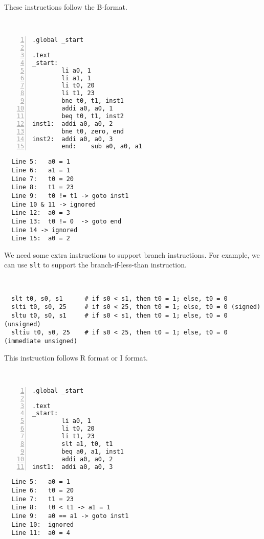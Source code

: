 These instructions follow the B-format.

\begin{eg}~

\begin{minipage}{0.5\textwidth}
\begin{Verbatim}[numbers=left,xleftmargin=5mm]
.global _start

.text
_start:
        li a0, 1
        li a1, 1
        li t0, 20
        li t1, 23
        bne t0, t1, inst1
        addi a0, a0, 1
        beq t0, t1, inst2
inst1:  addi a0, a0, 2
        bne t0, zero, end
inst2:  addi a0, a0, 3
        end:    sub a0, a0, a1
\end{Verbatim}
\end{minipage}
\begin{minipage}{0.5\textwidth}
\color{red}
\begin{verbatim}
  Line 5:   a0 = 1
  Line 6:   a1 = 1
  Line 7:   t0 = 20
  Line 8:   t1 = 23
  Line 9:   t0 != t1 -> goto inst1
  Line 10 & 11 -> ignored
  Line 12:  a0 = 3
  Line 13:  t0 != 0  -> goto end 
  Line 14 -> ignored
  Line 15:  a0 = 2
\end{verbatim}
\end{minipage}
\end{eg}

We need some extra instructions to support branch instructions. For example, we can use \verb|slt| to support the branch-if-less-than instruction.
\begin{codeBlock}~
\begin{verbatim}
  slt t0, s0, s1      # if s0 < s1, then t0 = 1; else, t0 = 0
  slti t0, s0, 25     # if s0 < 25, then t0 = 1; else, t0 = 0 (signed)
  sltu t0, s0, s1     # if s0 < s1, then t0 = 1; else, t0 = 0 (unsigned)
  sltiu t0, s0, 25    # if s0 < 25, then t0 = 1; else, t0 = 0 (immediate unsigned)
\end{verbatim}
\end{codeBlock}

This instruction follows R format or I format. 

\begin{eg}~

\begin{minipage}{0.5\textwidth}
\begin{Verbatim}[numbers=left,xleftmargin=5mm]
.global _start

.text
_start:
        li a0, 1
        li t0, 20
        li t1, 23
        slt a1, t0, t1
        beq a0, a1, inst1
        addi a0, a0, 2
inst1:  addi a0, a0, 3
\end{Verbatim}
\end{minipage}
\begin{minipage}{0.5\textwidth}
\color{red}
\begin{verbatim}
  Line 5:   a0 = 1
  Line 6:   t0 = 20
  Line 7:   t1 = 23
  Line 8:   t0 < t1 -> a1 = 1
  Line 9:   a0 == a1 -> goto inst1
  Line 10:  ignored
  Line 11:  a0 = 4
\end{verbatim}
\end{minipage}
\end{eg}

